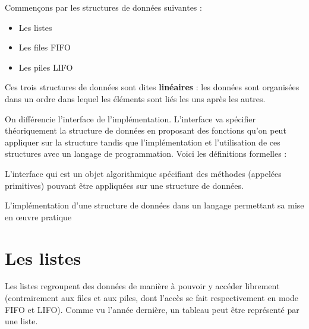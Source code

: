 Commençons par les structures de données suivantes :
\begin{itemize}
    \item Les listes
    \item Les files FIFO
    \item Les piles LIFO
\end{itemize}

\begin{tcolorbox}[enhanced,
    colback=green!25!black!10!white,colframe=green!75!black,title=Structuress linéaires,
    drop fuzzy shadow,watermark color=white]
Ces trois structures de données sont dites \textbf{linéaires} : les données sont organisées dans un ordre dans lequel les éléments sont liés les uns après les autres.
\end{tcolorbox}



On différencie l'interface de l'implémentation. L'interface va spécifier théoriquement la structure de données en proposant des fonctions qu'on peut appliquer sur la structure tandis que l'implémentation et l'utilisation de ces structures avec un langage de programmation. Voici les définitions formelles :

\begin{tcolorbox}[enhanced,
    colback=green!25!black!10!white,colframe=green!75!black,title=L'interface,
    drop fuzzy shadow,watermark color=white]
    L'interface qui est un objet algorithmique spécifiant des méthodes (appelées primitives) pouvant être appliquées sur une structure de données.
\end{tcolorbox}

\begin{tcolorbox}[enhanced,
    colback=green!25!black!10!white,colframe=green!75!black,title=L'implémentation,
    drop fuzzy shadow,watermark color=white]
    L'implémentation d'une structure de données dans un langage permettant sa mise en œuvre pratique
\end{tcolorbox}

\newpage
\section{Les listes}

Les listes regroupent des données de manière à pouvoir y accéder librement (contrairement aux files et aux piles, dont l'accès se fait respectivement en mode FIFO et LIFO). Comme vu l'année dernière, un tableau peut être représenté par une liste.\\

